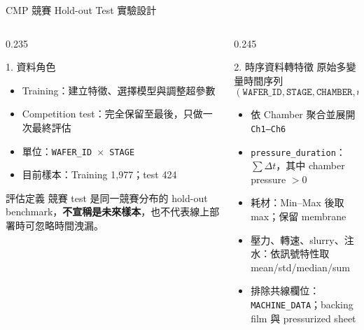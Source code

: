 
\begin{frame}{CMP 競賽 Hold-out Test 實驗設計}
\footnotesize

\begin{columns}[T,totalwidth=\textwidth]

\begin{column}{0.235\textwidth}
  \begin{block}{1. 資料角色}
    \begin{itemize}\setlength{\itemsep}{2pt}
      \item Training：建立特徵、選擇模型與調整超參數
      \item Competition test：完全保留至最後，只做一次最終評估
      \item 單位：\texttt{WAFER\_ID $\times$ STAGE}
      \item 目前樣本：Training 1,977；test 424
    \end{itemize}
  \end{block}

  \begin{alertblock}{評估定義}
    競賽 test 是同一競賽分布的 hold-out benchmark，\textbf{不宣稱是未來樣本}，也不代表線上部署時可忽略時間洩漏。
  \end{alertblock}
\end{column}

\begin{column}{0.245\textwidth}
  \begin{block}{2. 時序資料轉特徵}
    原始多變量時間序列
    \[
      (\texttt{WAFER\_ID},\texttt{STAGE},\texttt{CHAMBER},t)
    \]
    \vspace{-4pt}
    \begin{itemize}\setlength{\itemsep}{2pt}
      \item 依 Chamber 聚合並展開 \texttt{Ch1--Ch6}
      \item \texttt{pressure\_duration}：\(\sum\Delta t\)，其中 chamber pressure $>0$
      \item 耗材：Min--Max 後取 max；保留 membrane
      \item 壓力、轉速、slurry、注水：依訊號特性取 mean/std/median/sum
      \item 排除共線欄位：\texttt{MACHINE\_DATA}；backing film 與 pressurized sheet
    \end{itemize}
  \end{block}
\end{column}


\end{columns}
\end{frame}

